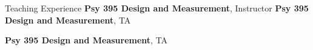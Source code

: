 \begin{rubric}{Teaching Experience}
\entry*[Summer 2017] \textbf{Psy 395 Design and Measurement}, Instructor
%
\entry*[Spring 2017] \textbf{Psy 395 Design and Measurement}, TA

\entry*[Fall 2016] \textbf{Psy 395 Design and Measurement}, TA

\end{rubric}